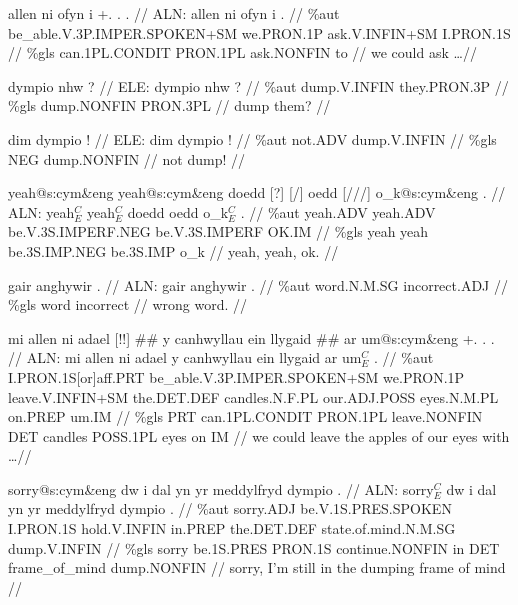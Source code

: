 \documentclass[a4paper,10pt]{article}
\begin{document}
\ex
\begingl[lingstyle=gergl]
\glchat allen ni ofyn i +. . . //
\glsurface ALN:  allen ni ofyn i .  //
\glauto \%aut  be\_able{\scriptsize .V.3P.IMPER.SPOKEN+SM} we{\scriptsize .PRON.1P} ask{\scriptsize .V.INFIN+SM} I{\scriptsize .PRON.1S}   //
\glmanual \%gls  can{\scriptsize .1PL.CONDIT} PRON{\scriptsize .1PL} ask{\scriptsize .NONFIN} to   //
\gleng we could ask \dots  //
\endgl
\xe

\ex
\begingl[lingstyle=gergl]
\glchat dympio nhw ? //
\glsurface ELE:  dympio nhw ?  //
\glauto \%aut  dump{\scriptsize .V.INFIN} they{\scriptsize .PRON.3P}   //
\glmanual \%gls  dump{\scriptsize .NONFIN} PRON{\scriptsize .3PL}   //
\gleng dump them? //
\endgl
\xe

\ex
\begingl[lingstyle=gergl]
\glchat dim dympio ! //
\glsurface ELE:  dim dympio !  //
\glauto \%aut  not{\scriptsize .ADV} dump{\scriptsize .V.INFIN}   //
\glmanual \%gls  NEG dump{\scriptsize .NONFIN}   //
\gleng not dump! //
\endgl
\xe

\ex
\begingl[lingstyle=gergl]
\glchat yeah@s:cym\&eng yeah@s:cym\&eng doedd [?] [/] oedd [///] o\_k@s:cym\&eng . //
\glsurface ALN:  yeah$^{C}_{E}$ yeah$^{C}_{E}$ doedd oedd o\_k$^{C}_{E}$ .  //
\glauto \%aut  yeah{\scriptsize .ADV} yeah{\scriptsize .ADV} be{\scriptsize .V.3S.IMPERF.NEG} be{\scriptsize .V.3S.IMPERF} OK{\scriptsize .IM}   //
\glmanual \%gls  yeah yeah be{\scriptsize .3S.IMP.NEG} be{\scriptsize .3S.IMP} o\_k   //
\gleng yeah, yeah, ok. //
\endgl
\xe

\ex
\begingl[lingstyle=gergl]
\glchat gair anghywir . //
\glsurface ALN:  gair anghywir .  //
\glauto \%aut  word{\scriptsize .N.M.SG} incorrect{\scriptsize .ADJ}   //
\glmanual \%gls  word incorrect   //
\gleng wrong word. //
\endgl
\xe

\ex
\begingl[lingstyle=gergl]
\glchat mi allen ni adael [!!] \#\# y canhwyllau ein llygaid \#\# ar um@s:cym\&eng +. . . //
\glsurface ALN:  mi allen ni adael y canhwyllau ein llygaid ar um$^{C}_{E}$ .  //
\glauto \%aut  I{\scriptsize .PRON.1S[or]aff.PRT} be\_able{\scriptsize .V.3P.IMPER.SPOKEN+SM} we{\scriptsize .PRON.1P} leave{\scriptsize .V.INFIN+SM} the{\scriptsize .DET.DEF} candles{\scriptsize .N.F.PL} our{\scriptsize .ADJ.POSS} eyes{\scriptsize .N.M.PL} on{\scriptsize .PREP} um{\scriptsize .IM}   //
\glmanual \%gls  PRT can{\scriptsize .1PL.CONDIT} PRON{\scriptsize .1PL} leave{\scriptsize .NONFIN} DET candles POSS{\scriptsize .1PL} eyes on IM   //
\gleng we could leave the apples of our eyes with \dots  //
\endgl
\xe

\ex
\begingl[lingstyle=gergl]
\glchat sorry@s:cym\&eng dw i dal yn yr meddylfryd dympio . //
\glsurface ALN:  sorry$^{C}_{E}$ dw i dal yn yr meddylfryd dympio .  //
\glauto \%aut  sorry{\scriptsize .ADJ} be{\scriptsize .V.1S.PRES.SPOKEN} I{\scriptsize .PRON.1S} hold{\scriptsize .V.INFIN} in{\scriptsize .PREP} the{\scriptsize .DET.DEF} state{\scriptsize .of.mind.N.M.SG} dump{\scriptsize .V.INFIN}   //
\glmanual \%gls  sorry be{\scriptsize .1S.PRES} PRON{\scriptsize .1S} continue{\scriptsize .NONFIN} in DET frame\_of\_mind dump{\scriptsize .NONFIN}   //
\gleng sorry, I'm still in the dumping frame of mind //
\endgl
\xe
\end{document}
